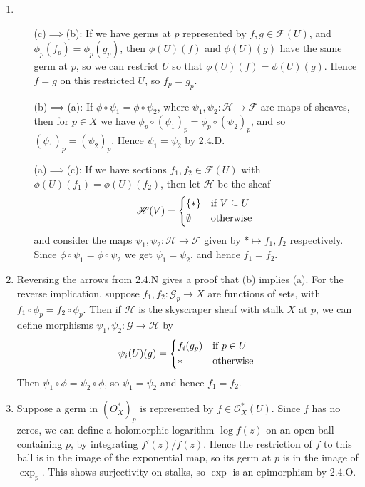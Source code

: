 \documentclass{report}
\renewcommand{\O}{\mathscr{O}} %
\newcommand{\scrF}{\mathscr{F}}
\newcommand{\scrG}{\mathscr{G}}
\newcommand{\scrH}{\mathscr{H}}
\begin{document}
\begin{enumerate}[label=\textbf{2.4.\Alph*.}]
	\item ~
	      \begin{itemize}
		      \item[(c)$\implies$(b):] If we have germs at $p$ represented by
			      $f,g\in\scrF(U)$, and $\phi_p(f_p)=\phi_p(g_p)$, then $\phi(U)(f)$
			      and $\phi(U)(g)$ have the same germ at $p$, so we can restrict
			      $U$ so that $\phi(U)(f)=\phi(U)(g)$. Hence $f=g$ on this
			      restricted $U$, so $f_p=g_p$.

		      \item[(b)$\implies$(a):] If $\phi\circ\psi_1=\phi\circ\psi_2$, where
			      $\psi_1,\psi_2:\scrH\to\scrF$ are maps of sheaves, then for $p\in X$
			      we have $\phi_p\circ(\psi_1)_p=\phi_p\circ(\psi_2)_p$, and so
			      $(\psi_1)_p=(\psi_2)_p$. Hence $\psi_1=\psi_2$ by 2.4.D.

		      \item[(a)$\implies$(c):] If we have sections $f_1,f_2\in\scrF(U)$ with
			      $\phi(U)(f_1)=\phi(U)(f_2)$, then let $\scrH$ be the sheaf
			      \begin{equation*}
				      \scrH(V) = \begin{cases*}
					      \{*\}     & if $V\subseteq U$ \\
					      \emptyset & otherwise
				      \end{cases*}
			      \end{equation*}
			      and consider the maps $\psi_1,\psi_2:\scrH\to\scrF$ given by
			      $*\mapsto f_1,f_2$ respectively. Since
			      $\phi\circ\psi_1=\phi\circ\psi_2$ we get $\psi_1=\psi_2$, and
			      hence $f_1=f_2$.
	      \end{itemize}

	\item Reversing the arrows from 2.4.N gives a proof that (b) implies (a).
	      For the reverse implication, suppose $f_1,f_2:\scrG_p\to X$ are functions
	      of sets, with $f_1\circ\phi_p=f_2\circ\phi_p$. Then if $\scrH$ is the
	      skyscraper sheaf with stalk $X$ at $p$, we can define morphisms
	      $\psi_1,\psi_2:\scrG\to\scrH$ by
	      \begin{equation*}
		      \psi_i(U)(g) = \begin{cases*}
			      f_i(g_p) & if $p\in U$ \\
			      *        & otherwise
		      \end{cases*}
	      \end{equation*}
	      Then $\psi_1\circ\phi=\psi_2\circ\phi$, so $\psi_1=\psi_2$ and
	      hence $f_1=f_2$.

	\item Suppose a germ in $(O_X^*)_p$ is represented by $f\in\O_X^*(U)$. Since
	      $f$ has no zeros, we can define a holomorphic logarithm $\log f(z)$ on
	      an open ball containing $p$, by integrating $f'(z)/f(z)$. Hence the
	      restriction of $f$ to this ball is in the image of the exponential map,
	      so its germ at $p$ is in the image of $\exp_p$. This shows surjectivity
	      on stalks, so $\exp$ is an epimorphism by 2.4.O.
\end{enumerate}
\end{document}
